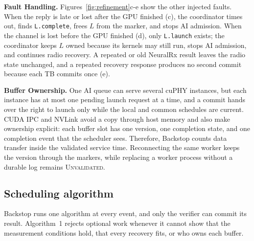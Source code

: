 \documentclass[acmsmall,screen,review,anonymous]{acmart}
\newcommand{\sys}{Backstop\xspace}
\newcommand{\UQ}{\textsc{Unvalidated}\xspace}
\newcommand{\NRx}{NeuralRx\xspace}
\begin{document}
\noindent\textbf{Fault Handling.}
Figures~\ref{fig:refinement}c-e show the other injected faults. When the reply is late or lost after the
GPU finished (c), the coordinator times out, finds \texttt{L.complete}, frees $L$ from the marker, and
stops AI admission. When the channel is lost before the GPU finished (d), only \texttt{L.launch} exists;
the coordinator keeps $L$ owned because its kernels may still run, stops AI admission, and continues radio
recovery. A repeated or old \NRx result leaves the radio state unchanged, and a repeated recovery response
produces no second commit because each TB commits once (e).

\noindent\textbf{Buffer Ownership.}
One AI queue can serve several cuPHY instances, but each instance has at most one pending launch request
at a time, and a commit hands over the right to launch only while the local and common schedules are
current. CUDA IPC and NVLink avoid a copy through host memory and also make ownership explicit: each
buffer slot has one version, one completion state, and one completion event that the scheduler sees.
Therefore, \sys counts data transfer inside the validated service time. Reconnecting the same worker
keeps the version through the markers, while replacing a worker process without a durable log remains
\UQ.

\subsection{Scheduling algorithm}
\label{sec:design-algorithm}

\sys runs one algorithm at every event, and only the verifier can commit its result. Algorithm~1 rejects
optional work whenever it cannot show that the measurement conditions hold, that every recovery fits, or
who owns each buffer.
\end{document}
